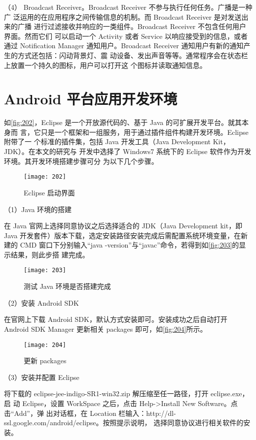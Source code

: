 （4） Broadcast Receiver。Broadcast Receiver 不参与执行任何任务。广播是一种广
泛运用的在应用程序之间传输信息的机制。而 Broadcast Receiver 是对发送出来的广播
进行过滤接收并响应的一类组件。Broadcast Receiver 不包含任何用户界面。然而它们
可以启动一个 Activity 或者 Service 以响应接受到的信息，或者通过 Notification Manager
通知用户。Broadcast Receiver 通知用户有新的通知产生的方式还包括：闪动背景灯、震
动设备、发出声音等等。通常程序会在状态栏上放置一个持久的图标，用户可以打开这
个图标并读取通知信息。

\section{Android 平台应用开发环境}
如\autoref{fig:202}，Eclipse 是一个开放源代码的、基于 Java 的可扩展开发平台。就其本身而
言，它只是一个框架和一组服务，用于通过插件组件构建开发环境。Eclipse 附带了一
个标准的插件集，包括 Java 开发工具（Java Development Kit，JDK）。在本文的研究与
开发中选择了 Windows7 系统下的 Eclipse 软件作为开发环境。其开发环境搭建步骤可分
为以下几个步骤\cite{7}。

\begin{figure}[htbp]
    \centering
    \texttt{[image: 202]}
    \caption{\label{fig:202}Eclipse 启动界面}
\end{figure}

（1）Java 环境的搭建

在 Java 官网上选择同意协议之后选择适合的 JDK（Java Development kit，即 Java
开发套件）版本下载，选定安装路径安装完成后需配置系统环境变量，在新建的 CMD
窗口下分别输入“java -version”与“javac”命令，若得到如\autoref{fig:203}的显示结果，则此步搭
建完成。

\begin{figure}[htbp]
    \centering
    \texttt{[image: 203]}
    \caption{\label{fig:203}测试 Java 环境是否搭建完成}
\end{figure}

（2）安装 Android SDK

在官网上下载 Android SDK，默认方式安装即可。安装成功之后自动打开 Android
SDK Manager 更新相关 packages 即可，如\autoref{fig:204}所示。

\begin{figure}[htbp]
    \centering
    \texttt{[image: 204]}
    \caption{\label{fig:204}更新 packages}
\end{figure}

（3）安装并配置 Eclipse

将下载的 eclipse-jee-indigo-SR1-win32.zip 解压缩至任一路径，打开 eclipse.exe，启
动 Eclipse，设置 WorkSpace 之后，点击 Help->Install New Software。点击“Add”，弹
出对话框，在 Location 栏输入：http://dl-ssl.google.com/android/eclipse。按照提示说明，
选择同意协议进行相关软件的安装。

